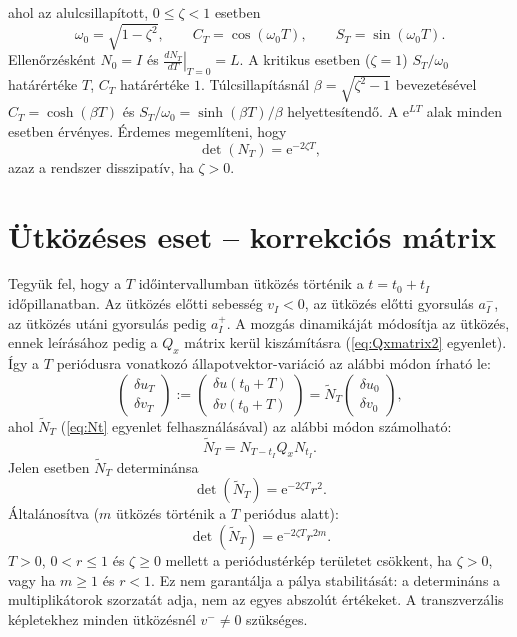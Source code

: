 ahol az alulcsillapított, $0\leq\zeta<1$ esetben
\[
\omega_0=\sqrt{1-\zeta^2},\qquad C_T=\cos(\omega_0T),\qquad S_T=\sin(\omega_0T).
\]
Ellenőrzésként $N_0=I$ és $\left.\frac{dN_T}{dT}\right|_{T=0}=L$. A kritikus esetben ($\zeta=1$) $S_T/\omega_0$ határértéke $T$, $C_T$ határértéke $1$. Túlcsillapításnál $\beta=\sqrt{\zeta^2-1}$ bevezetésével $C_T=\cosh(\beta T)$ és $S_T/\omega_0=\sinh(\beta T)/\beta$ helyettesítendő. A $\mathrm{e}^{LT}$ alak minden esetben érvényes.
Érdemes megemlíteni, hogy
\begin{equation}
\det\left(N_T \right)=\mathrm{e}^{-2\zeta T},
\end{equation}
azaz a rendszer disszipatív, ha $\zeta>0$.

\section{Ütközéses eset -- korrekciós mátrix}

Tegyük fel, hogy a $T$ időintervallumban ütközés történik a $t=t_0+t_I$ időpillanatban. Az ütközés előtti sebesség $v_I<0$, az ütközés előtti gyorsulás $a_I^-$, az ütközés utáni gyorsulás pedig $a_I^+$. A mozgás dinamikáját módosítja az ütközés, ennek leírásához pedig a $Q_x$ mátrix kerül kiszámításra (\eqref{eq:Qxmatrix2} egyenlet). Így a $T$ periódusra vonatkozó állapotvektor-variáció az alábbi módon írható le:
\begin{equation}
\begin{pmatrix}
\delta u_T\\ \delta v_T
\end{pmatrix}:=
\begin{pmatrix}
\delta u(t_0+T)\\
\delta v(t_0+T)
\end{pmatrix}
=\tilde{N}_T\begin{pmatrix}
\delta u_0\\ \delta v_0
\end{pmatrix},
\end{equation}
ahol $\tilde{N}_T$ (\eqref{eq:Nt} egyenlet felhasználásával) az alábbi módon számolható:
\begin{equation}
\tilde{N}_T=N_{T-t_I}Q_xN_{t_I}.
\end{equation}
Jelen esetben $\tilde{N}_T$ determinánsa
\begin{equation}
\det\left( \tilde{N}_T\right)=\mathrm{e}^{-2\zeta T}r^2.
\end{equation}
Általánosítva ($m$ ütközés történik a $T$ periódus alatt):
\begin{equation}
\det\left(\tilde{N}_T \right)=\mathrm{e}^{-2\zeta T}r^{2m}.
\end{equation}
$T>0$, $0<r\leq1$ és $\zeta\geq0$ mellett a periódustérkép területet csökkent, ha $\zeta>0$, vagy ha $m\geq1$ és $r<1$. Ez nem garantálja a pálya stabilitását: a determináns a multiplikátorok szorzatát adja, nem az egyes abszolút értékeket. A transzverzális képletekhez minden ütközésnél $v^-\neq0$ szükséges.

